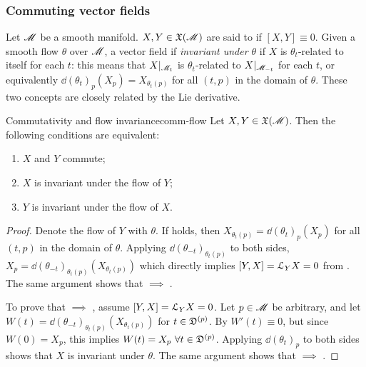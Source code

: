 \subsubsection{Commuting vector fields}

Let $ \mathscr{M} $ be a smooth manifold. $ X,Y \in \mathfrak{X}(\mathscr{M}) $ are said to  if $ [X,Y] \equiv 0 $. Given a smooth flow $ \theta $ over $ \mathscr{M} $, a vector field if \emph{invariant under $ \theta $} if $ X $ is $ \theta_t $-related to itself for each $ t $: this means that $ X \vert_{\mathscr{M}_t} $ is $ \theta_t $-related to $ X \vert_{\mathscr{M}_{-t}} $ for each $ t $, or equivalently $ \dd (\theta_t)_p (X_p) = X_{\theta_t(p)} $ for all $ (t,p) $ in the domain of $ \theta $. These two concepts are closely related by the Lie derivative.

\begin{proposition}{Commutativity and flow invariance}{comm-flow}
  Let $ X,Y \in \mathfrak{X}(\mathscr{M}) $. Then the following conditions are equivalent:
  \begin{enumerate}
    \item \label{item:comm-flow-1} $ X $ and $ Y $ commute;
    \item \label{item:comm-flow-2} $ X $ is invariant under the flow of $ Y $;
    \item \label{item:comm-flow-3} $ Y $ is invariant under the flow of $ X $.
  \end{enumerate}
\end{proposition}

\begin{proofbox}
  \begin{proof}
    Denote the flow of $ Y $ with $ \theta $. If  holds, then $ X_{\theta_t(p)} = \dd (\theta_t)_p (X_p) $ for all $ (t,p) $ in the domain of $ \theta $. Applying $ \dd (\theta_{-t})_{\theta_t(p)} $ to both sides, $ X_p = \dd (\theta_{-t})_{\theta_t(p)}(X_{\theta_t(p)}) $ which directly implies $ [Y,X] = \EuScript{L}_Y X = 0 $ from . The same argument shows that  $ \implies $ .

    To prove that  $ \implies $ , assume $ [Y,X] = \EuScript{L}_Y X = 0 $. Let $ p \in \mathscr{M} $ be arbitrary, and let $ W(t) = \dd (\theta_{-t})_{\theta_t(p)}(X_{\theta_t(p)}) $ for $ t \in \mathfrak{D}^{(p)} $. By  $ W'(t) \equiv 0 $, but since $ W(0) = X_p $, this implies $ W(t) = X_p \,\,\forall t \in \mathfrak{D}^{(p)} $. Applying $ \dd (\theta_t)_p $ to both sides shows that $ X $ is invariant under $ \theta $. The same argument shows that  $ \implies $ .
  \end{proof}
\end{proofbox}

